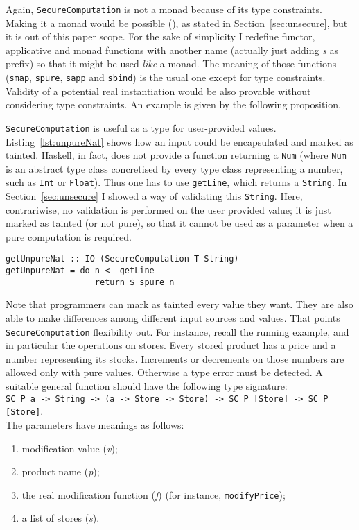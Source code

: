 Again, \texttt{SecureComputation} is not a monad because of its type constraints. Making it a monad would be possible (\cite{Sculthorpe:13:ConstrainedMonad}), as stated in Section~\ref{sec:unsecure}, but it is out of this paper scope. For the sake of simplicity I redefine functor, applicative and monad functions with another name (actually just adding \textit{s} as prefix) so that it might be used \textit{like} a monad. The meaning of those functions (\texttt{smap}, \texttt{spure}, \texttt{sapp} and \texttt{sbind}) is the usual one except for type constraints. Validity of a potential real instantiation would be also provable without considering type constraints. An example is given by the following proposition.

\texttt{SecureComputation} is useful as a type for user-provided values. Listing~\ref{lst:unpureNat} shows how an input could be encapsulated and marked as tainted. Haskell, in fact, does not provide a function returning a \texttt{Num} (where \texttt{Num} is an abstract type class concretised by every type class representing a number, such as \texttt{Int} or \texttt{Float}). Thus one has to use \texttt{getLine}, which returns a \texttt{String}. In Section~\ref{sec:unsecure} I showed a way of validating this \texttt{String}. Here, contrariwise, no validation is performed on the user provided value; it is just marked as tainted (or not pure), so that it cannot be used as a parameter when a pure computation is required.
\begin{lstlisting}[caption={Tainted natural number},label={lst:unpureNat}, breaklines=true]
getUnpureNat :: IO (SecureComputation T String)
getUnpureNat = do n <- getLine
                  return $ spure n
\end{lstlisting}
Note that programmers can mark as tainted every value they want. They are also able to make differences among different input sources and values. That points \texttt{SecureComputation} flexibility out. For instance, recall the running example, and in particular the operations on stores. Every stored product has a price and a number representing its stocks. Increments or decrements on those numbers are allowed only with pure values. Otherwise a type error must be detected. A suitable general function should have the following type signature:\\
\texttt{SC P a -> String -> (a -> Store -> Store) -> SC P [Store] -> SC P [Store]}. \\
The parameters have meanings as follows:
\begin{enumerate}
	\item modification value (\textit{v});
	\item product name (\textit{p});
	\item the real modification function (\textit{f}) (for instance, \texttt{modifyPrice});
	\item a list of stores (\textit{s}).
\end{enumerate}
